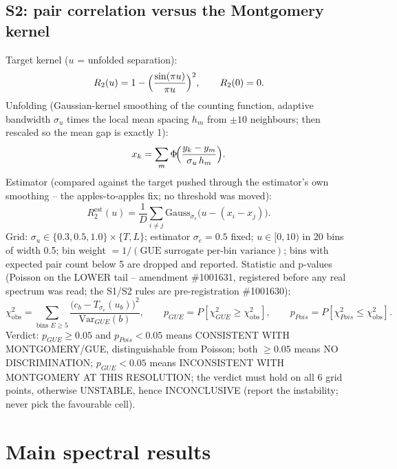 \documentclass[11pt]{article}
\begin{document}
\subsection{S2: pair correlation versus the Montgomery kernel}
Target kernel ($u$ = unfolded separation):
\begin{equation*}
R_2(u) = 1 - \Bigl(\frac{\sin(\pi u)}{\pi u}\Bigr)^{2}, \qquad R_2(0) = 0.
\end{equation*}
Unfolding (Gaussian-kernel smoothing of the counting function, adaptive
bandwidth $\sigma_u$ times the local mean spacing $h_m$ from $\pm 10$
neighbours; then rescaled so the mean gap is exactly 1):
\begin{equation*}
x_k = \sum_m \Phi\!\Bigl(\frac{y_k - y_m}{\sigma_u\, h_m}\Bigr).
\end{equation*}
Estimator (compared against the target pushed through the estimator's
own smoothing -- the apples-to-apples fix; no threshold was moved):
\begin{equation*}
R_2^{\mathrm{est}}(u) = \frac{1}{D} \sum_{i \neq j}
\mathrm{Gauss}_{\sigma_e}\!\bigl(u - (x_i - x_j)\bigr).
\end{equation*}
Grid: $\sigma_u \in \{0.3, 0.5, 1.0\} \times \{T, L\}$; estimator
$\sigma_e = 0.5$ fixed; $u \in [0, 10)$ in 20 bins of width 0.5; bin
weight $= 1 / (\text{GUE surrogate per-bin variance})$; bins with
expected pair count below 5 are dropped and reported. Statistic and
p-values (Poisson on the LOWER tail -- amendment \#1001631, registered
before any real spectrum was read; the S1/S2 rules are pre-registration
\#1001630):
\begin{equation*}
\chi^2_{\mathrm{obs}} = \!
\sum_{\text{bins } E \ge 5}\!
\frac{\bigl(c_b - T_{\sigma_e}(u_b)\bigr)^{2}}{\mathrm{Var}_{GUE}(b)},
\qquad
p_{GUE} = P[\chi^2_{GUE} \ge \chi^2_{\mathrm{obs}}],
\qquad
p_{Pois} = P[\chi^2_{Pois} \le \chi^2_{\mathrm{obs}}].
\end{equation*}
Verdict: $p_{GUE} \ge 0.05$ and $p_{Pois} < 0.05$ means CONSISTENT WITH
MONTGOMERY/GUE, distinguishable from Poisson; both $\ge 0.05$ means NO
DISCRIMINATION; $p_{GUE} < 0.05$ means INCONSISTENT WITH MONTGOMERY AT
THIS RESOLUTION; the verdict must hold on all 6 grid points, otherwise
UNSTABLE, hence INCONCLUSIVE (report the instability; never pick the
favourable cell).

\section{Main spectral results}
\end{document}
